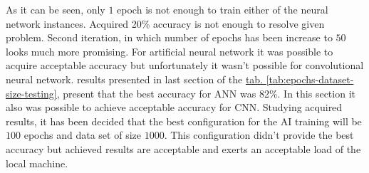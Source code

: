As it can be seen, only $1$ epoch is not enough to train either of the neural network instances. Acquired 20\% accuracy is not enough to resolve given problem. Second iteration, in which number of epochs has been increase to $50$ looks much more promising. For artificial neural network it was possible to acquire acceptable accuracy but unfortunately it wasn't possible for convolutional neural network. results presented in last section of the \hyperref[tab:epochs-dataset-size-testing]{tab. \ref*{tab:epochs-dataset-size-testing}}, present that the best accuracy for ANN was 82\%. In this section it also was possible to achieve acceptable accuracy for CNN. Studying acquired results, it has been decided that the best configuration for the AI training will be $100$ epochs and data set of size $1000$. This configuration didn't provide the best accuracy but achieved results are acceptable and exerts an acceptable load of the local machine.

